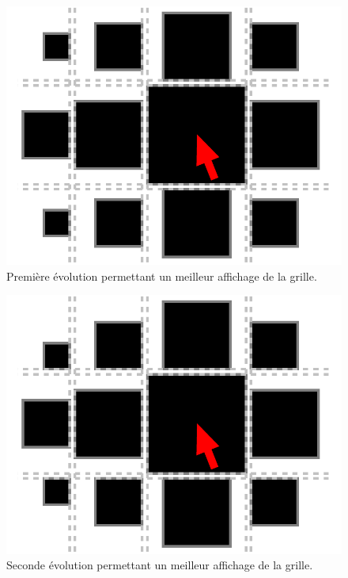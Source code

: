 \begin{minipage}[H]{.5\linewidth}
\begin{figure}[H]
  \centering
  \includegraphics[width=\textwidth]{../resources/illustrations/seq_app_mouse_v2}
  \caption{Première évolution permettant un meilleur affichage de la grille.}
\end{figure}
\end{minipage}
\begin{minipage}[H]{.5\linewidth}
\begin{figure}[H]
  \centering
  \includegraphics[width=\textwidth]{../resources/illustrations/seq_app_mouse_v3}
  \caption{Seconde évolution permettant un meilleur affichage de la grille.}
\end{figure}
\end{minipage}

